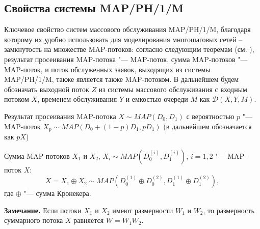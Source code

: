 \subsection{Свойства системы MAP/PH/1/M}\label{sec:ch4_queue_net_system_props}

Ключевое свойство систем массового обслуживания MAP/PH/1/M, благодаря которому их удобно использовать для моделирования многошаговых сетей -- замкнутость на множестве MAP-потоков: согласно следующим теоремам (см. \cite{VishnevskyDudin2018}), результат просеивания MAP-потока "--- MAP-поток, сумма MAP-потоков "--- MAP-поток, и поток обслуженных заявок, выходящих из системы MAP/PH/1/M, также является также MAP-потоком. В дальнейшем будем обозначать выходной поток $Z$ из системы массового обслуживания с входным потоком $X$, временем обслуживания $Y$ и емкостью очереди $M$ как $\mathcal{D}(X, Y, M)$.

\begin{thm}\label{th:ch4_sifted_map}\textnormal{\cite{VishnevskyDudin2018}}
  Результат просеивания MAP-потока $X \sim MAP(D_{0},D_{1})$ с вероятностью $p$ "--- MAP-поток $X_{p} \sim MAP(D_{0}+(1-p)D_{1},pD_{1})$ (в дальнейшем обозначается как $pX$)
\end{thm}

\begin{thm}\label{th:ch4_maps_sum}\textnormal{\cite{VishnevskyDudin2018}}
  Сумма MAP-потоков $X_{1}$ и $X_{2}$, $X_i \sim MAP(D_{0}^{(i)},D_{1}^{(i)})$, $i=1,2$ "--- MAP-поток $X$:
  $$
    X = X_{1} \oplus X_{2} \sim MAP(D_{0}^{(1)} \oplus D_{0}^{(2)},D_{1}^{(1)} \oplus D_{1}^{(2)}),
  $$
  где $\oplus$ "--- сумма Кронекера.
\end{thm}

\textbf{Замечание.} Если потоки $X_1$ и $X_2$ имеют размерности $W_1$ и $W_2$, то размерность суммарного потока $X$ равняется $W = W_1 W_2$.

